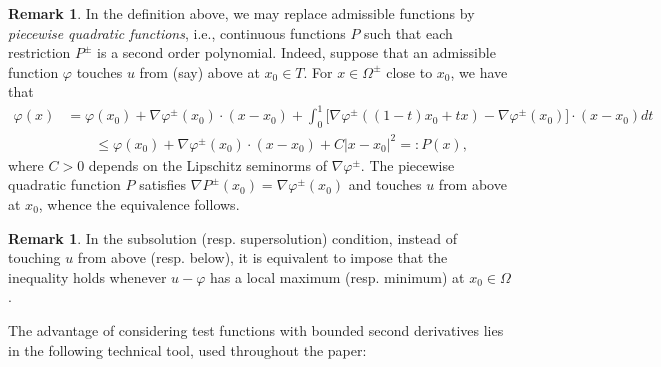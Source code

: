 \documentclass[letter,11pt]{amsart}
\theoremstyle{definition}
\newtheorem{rem}[thm]{Remark}
\numberwithin{equation}{section}
\begin{document}
\begin{rem}
In the definition above, we may replace admissible functions by \emph{piecewise quadratic functions}, i.e., continuous functions $P$ such that each restriction $P^{\pm}$ is a second order polynomial.
Indeed, suppose that an admissible function $\varphi$ touches $u$ from (say) above at $x_0 \in T$.
For $x \in \Omega^{\pm}$ close to $x_0$, we have that
\[
\begin{split}
\varphi(x) &= \varphi(x_0) + \nabla \varphi^{\pm}(x_0) \cdot (x-x_{0}) + \int_{0}^{1} \big[\nabla \varphi^{\pm}((1-t)x_0 + t x) - \nabla \varphi^{\pm}(x_0)\big] \cdot (x- x_0) dt\\
& \qquad \leq \varphi(x_0) + \nabla \varphi^{\pm}(x_0) \cdot (x-x_{0}) + C |x-x_0|^{2} =: P(x),
\end{split}
\]
where $C > 0$ depends on the Lipschitz seminorms of $\nabla \varphi^{\pm}$.
The piecewise quadratic function $P$ satisfies $\nabla P^{\pm}(x_0) = \nabla \varphi^{\pm}(x_0)$ and touches $u$ from above at $x_0$, whence the equivalence follows.
\end{rem}

\begin{rem}
In the subsolution (resp. supersolution) condition, instead of touching $u$ from above (resp. below), it is equivalent to impose that the inequality holds whenever $u - \varphi$ has a local maximum (resp. minimum) at $x_0 \in \Omega$.
\end{rem}

\medskip

The advantage of considering test functions with bounded second derivatives lies in the following technical tool, used throughout the paper:
\end{document}
